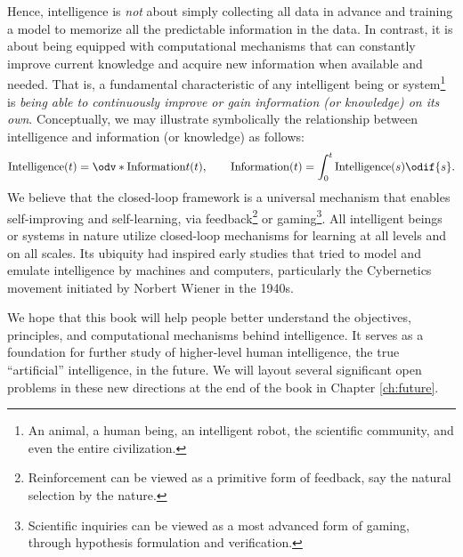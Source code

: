\documentclass[../../book-main.tex]{subfiles}
\begin{document}
Hence, intelligence is {\em not} about simply collecting all data in advance and training a model to memorize all the predictable information in the data. In contrast, it is about being equipped with computational mechanisms that can constantly improve current knowledge and acquire new information when available and needed. That is, a fundamental characteristic of any intelligent being or system\footnote{An animal, a human being, an intelligent robot, the scientific community, and even the entire civilization.} is {\em being able to continuously improve or gain information (or knowledge) on its own}. Conceptually, we may illustrate symbolically the relationship between intelligence and information (or knowledge) as follows:
\begin{equation}
\operatorname{Intelligence}(t) = \odv*{\operatorname{Information}}{t}(t), \qquad 
\operatorname{Information}(t)  = \int_0^t \operatorname{Intelligence}(s) \odif{s}.
\end{equation}
We believe that the closed-loop framework is a universal mechanism that enables self-improving and self-learning, via feedback\footnote{Reinforcement can be viewed as a primitive form of feedback, say the natural selection by the nature.} or gaming\footnote{Scientific inquiries can be viewed as a most advanced form of gaming, through hypothesis formulation and verification.}. All intelligent beings or systems in nature utilize closed-loop mechanisms for learning at all levels and on all scales. Its ubiquity had inspired early studies that tried to model and emulate intelligence by machines and computers, particularly the Cybernetics movement initiated by Norbert Wiener in the 1940s. 

We hope that this book will help people better understand the objectives, principles, and computational mechanisms behind intelligence. It serves as a foundation for further study of higher-level human intelligence, the true ``artificial'' intelligence, in the future. We will layout several significant open problems in these new directions at the end of the book in Chapter \ref{ch:future}.
\end{document}
